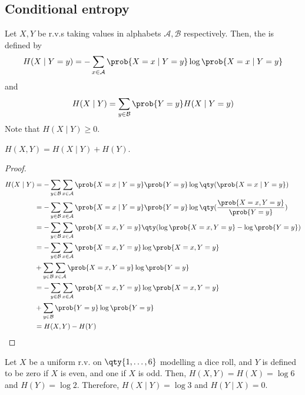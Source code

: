\subsection{Conditional entropy}
\begin{definition}
    Let $X, Y$ be r.v.s taking values in alphabets $\mathcal A, \mathcal B$ respectively.
    Then, the  is defined by
    \begin{align*}
        H(X \mid Y = y) = - \sum_{x \in \mathcal A} \prob{X = x \mid Y = y} \log \prob{X = x \mid Y = y}
    \end{align*}
    and
    \begin{align*}
        H(X \mid Y) = \sum_{y \in \mathcal B} \prob{Y = y} H(X \mid Y = y)
    \end{align*}
    Note that $H(X \mid Y) \geq 0$.
\end{definition}
\begin{lemma}
    $H(X,Y) = H(X \mid Y) + H(Y)$.
\end{lemma}
\begin{proof}
    \begin{align*}
        H(X \mid Y) &= -\sum_{y \in \mathcal B} \sum_{x \in \mathcal A} \prob{X = x \mid Y = y} \prob{Y = y} \log \qty(\prob{X = x \mid Y = y}) \\
        &= -\sum_{y \in \mathcal B} \sum_{x \in \mathcal A} \prob{X = x \mid Y = y} \prob{Y = y} \log \qty(\frac{\prob{X = x, Y = y}}{\prob{Y = y}}) \\
        &= -\sum_{y \in \mathcal B} \sum_{x \in \mathcal A} \prob{X = x, Y = y} \qty(\log \prob{X = x, Y = y} - \log \prob{Y = y}) \\
        &= -\sum_{y \in \mathcal B} \sum_{x \in \mathcal A} \prob{X = x, Y = y} \log \prob{X = x, Y = y} \\
        &+ \sum_{y \in \mathcal B} \sum_{x \in \mathcal A} \prob{X = x, Y = y} \log \prob{Y = y} \\
        &= -\sum_{y \in \mathcal B} \sum_{x \in \mathcal A} \prob{X = x, Y = y} \log \prob{X = x, Y = y} \\
        &+ \sum_{y \in \mathcal B} \prob{Y = y} \log \prob{Y = y} \\
        &= H(X,Y) - H(Y)
    \end{align*}
\end{proof}
\begin{example}
    Let $X$ be a uniform r.v. on $\qty{1, \dots, 6}$ modelling a dice roll, and $Y$ is defined to be zero if $X$ is even, and one if $X$ is odd.
    Then, $H(X,Y) = H(X) = \log 6$ and $H(Y) = \log 2$.
    Therefore, $H(X \mid Y) = \log 3$ and $H(Y \mid X) = 0$.
\end{example}
